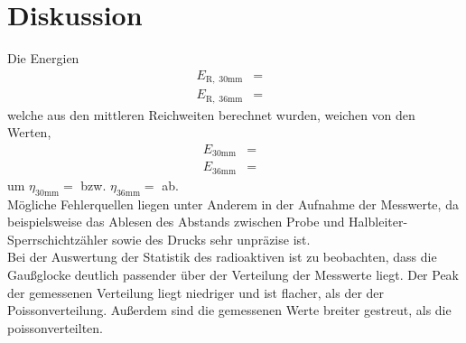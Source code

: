 \section{Diskussion}
\label{sec:Diskussion}


Die Energien
\begin{eqnarray}
    E_{\mathrm{R, \; 30mm}} &=&     \\
    E_{\mathrm{R, \; 36mm}} &=&
\end{eqnarray}
welche aus den mittleren Reichweiten berechnet wurden, weichen von den Werten,
\begin{eqnarray}
    E_{\mathrm{30mm}} &=&   \\
    E_{\mathrm{36mm}} &=&
\end{eqnarray}
um $\eta_{\mathrm{30mm}} = $ bzw. $\eta_{\mathrm{36mm}} = $ ab.\\

Mögliche Fehlerquellen liegen unter Anderem in der Aufnahme der Messwerte, 
da beispielsweise das Ablesen des Abstands zwischen Probe und Halbleiter-Sperrschichtzähler sowie des Drucks sehr unpräzise ist.\\
Bei der Auswertung der Statistik des radioaktiven ist zu beobachten, dass die 
Gaußglocke deutlich passender über der Verteilung der Messwerte liegt. 
Der Peak der gemessenen Verteilung liegt niedriger und ist flacher, als der der Poissonverteilung.
Außerdem sind die gemessenen Werte breiter gestreut, als die poissonverteilten.\\